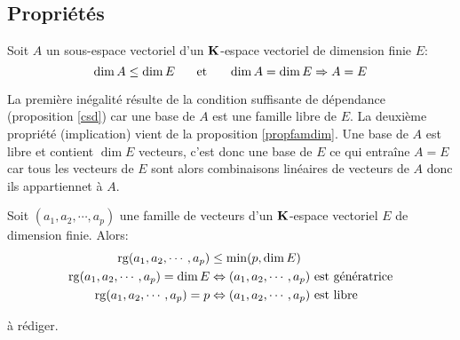 \subsection{Propriétés}
\begin{propn}\label{dimsev}
Soit $A$ un sous-espace vectoriel d'un $\mathbf{K}$-espace vectoriel de dimension finie $E$:
\begin{displaymath}
 \dim A \leq \dim E \hspace{0.5cm}\text{ et } \hspace{0.5cm}
 \dim A = \dim E \Rightarrow A = E
\end{displaymath}
\end{propn}
\begin{demo}
La première inégalité résulte de la condition suffisante de dépendance (proposition \ref{csd}) car une base de $A$ est une famille libre de $E$.\newline
La deuxième propriété (implication) vient de la proposition \ref{propfamdim}. Une base de $A$ est libre et contient $\dim E$ vecteurs, c'est donc une base de $E$ ce qui entraîne $A=E$ car tous les vecteurs de $E$ sont alors combinaisons linéaires de vecteurs de $A$ donc ils appartiennet à $A$. 
\end{demo}

\begin{propn}
 Soit $(a_1,a_2,\cdots,a_p)$ une famille de vecteurs d'un $\mathbf{K}$-espace vectoriel $E$  de dimension finie. Alors:
\begin{align*}
 \mathop{\mathrm{rg}} (a_1,a_2,\cdots,a_p) &\leq \min(p,\dim E) \\
 \mathop{\mathrm{rg}} (a_1,a_2,\cdots,a_p)=\dim E &\Leftrightarrow (a_1,a_2,\cdots,a_p) \text{ est génératrice}\\
 \mathop{\mathrm{rg}} (a_1,a_2,\cdots,a_p)=p &\Leftrightarrow (a_1,a_2,\cdots,a_p) \text{ est libre}
\end{align*}
\end{propn}
\begin{demo}
 à rédiger.
\end{demo}

